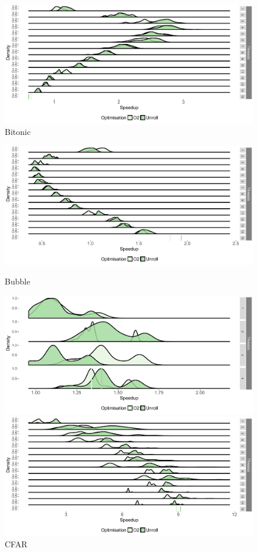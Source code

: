 \begin{appendices}
\begin{figure}[t]
\includegraphics[width=1\textwidth]{streamit-paper/graphics/appendixgraphs/bitonic-total2.pdf}
\caption{Bitonic}\label{chp:stream:bt2}
\end{figure}

\begin{figure}[t]
\center
\includegraphics[width=1\textwidth]{streamit-paper/graphics/appendixgraphs/bubble-total2.pdf}
\caption{Bubble}\label{chp:stream:bt3}
\center
\includegraphics[width=1\textwidth]{streamit-paper/graphics/appendixgraphs/cfar-total2.pdf}
\caption{CFAR}\label{chp:stream:ct}
\center
\includegraphics[width=1\textwidth]{streamit-paper/graphics/appendixgraphs/channel-total2.pdf}

\end{figure}
\end{appendices}
